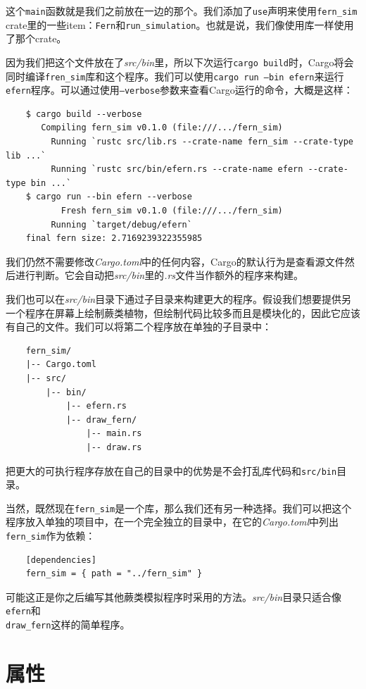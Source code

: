 这个\texttt{main}函数就是我们之前放在一边的那个。我们添加了\texttt{use}声明来使用\texttt{fern\_sim} crate里的一些item：\texttt{Fern}和\texttt{run\_simulation}。也就是说，我们像使用库一样使用了那个crate。

因为我们把这个文件放在了\emph{src/bin}里，所以下次运行\texttt{cargo build}时，Cargo将会同时编译\texttt{fren\_sim}库和这个程序。我们可以使用\texttt{cargo run --bin efern}来运行\texttt{efern}程序。可以通过使用\texttt{--verbose}参数来查看Cargo运行的命令，大概是这样：
\begin{verbatim}
    $ cargo build --verbose
       Compiling fern_sim v0.1.0 (file:///.../fern_sim)
         Running `rustc src/lib.rs --crate-name fern_sim --crate-type lib ...`
         Running `rustc src/bin/efern.rs --crate-name efern --crate-type bin ...`
    $ cargo run --bin efern --verbose
           Fresh fern_sim v0.1.0 (file:///.../fern_sim)
         Running `target/debug/efern`
    final fern size: 2.7169239322355985
\end{verbatim}

我们仍然不需要修改\emph{Cargo.toml}中的任何内容，Cargo的默认行为是查看源文件然后进行判断。它会自动把\emph{src/bin}里的\emph{.rs}文件当作额外的程序来构建。

我们也可以在\emph{src/bin}目录下通过子目录来构建更大的程序。假设我们想要提供另一个程序在屏幕上绘制蕨类植物，但绘制代码比较多而且是模块化的，因此它应该有自己的文件。我们可以将第二个程序放在单独的子目录中：
\begin{verbatim}
    fern_sim/
    |-- Cargo.toml
    |-- src/
        |-- bin/
            |-- efern.rs
            |-- draw_fern/
                |-- main.rs
                |-- draw.rs
\end{verbatim}

把更大的可执行程序存放在自己的目录中的优势是不会打乱库代码和\texttt{src/bin}目录。

当然，既然现在\texttt{fern\_sim}是一个库，那么我们还有另一种选择。我们可以把这个程序放入单独的项目中，在一个完全独立的目录中，在它的\emph{Cargo.toml}中列出\texttt{fern\_sim}作为依赖：
\begin{verbatim}
    [dependencies]
    fern_sim = { path = "../fern_sim" }
\end{verbatim}

可能这正是你之后编写其他蕨类模拟程序时采用的方法。\emph{src/bin}目录只适合像\texttt{efern}和\\
\texttt{draw\_fern}这样的简单程序。

\section{属性}\label{attribute}

